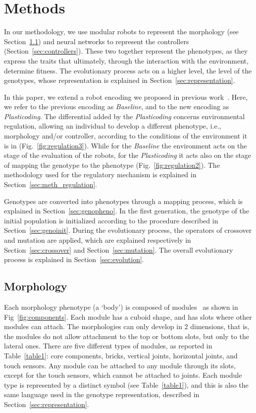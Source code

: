 \documentclass[utf8]{frontiersSCNS} %
\newcommand{\ka}[1]{\todo[color=blue!40, inline, author=Karine]{#1}}
\begin{document}
\section{Methods}
In our methodology, we use modular robots to represent the morphology (see Section~\ref{sec:morphology}) and neural networks to represent the controllers (Section~\ref{sec:controllers}). These two together represent the phenotypes, as they express the traits that ultimately, through the interaction with the environment, determine fitness. The evolutionary process acts on a higher level, the level of the genotypes, whose representation is explained in Section~\ref{sec:representation}. 

In this paper, we extend a robot encoding we proposed in previous work~\citep{miras2019effects}. Here, we refer to the previous encoding as \textit{Baseline}, and to the new encoding as \textit{Plasticoding}. The differential added by the \textit{Plasticoding} concerns environmental regulation, allowing an individual to develop a different phenotype, i.e., morphology and/or controller, according to the conditions of the environment it is in (Fig.~\ref{fig:regulation3}). While for the \textit{Baseline} the environment acts on the stage of the evaluation of the robots, for the \textit{Plasticoding} it acts also on the stage of mapping the genotype to the phenotype (Fig.~\ref{fig:regulation2}). The methodology used for the regulatory mechanism is explained in Section~\ref{sec:meth_regulation}.

Genotypes are converted into phenotypes through a mapping process, which is explained in Section~\ref{sec:genopheno}. In the first generation, the genotype of the initial population is initialized according to the procedure described in Section~\ref{sec:genoinit}.  During the evolutionary process, the operators of crossover and mutation are applied, which are explained respectively in Section~\ref{sec:crossover} and Section~\ref{sec:mutation}. The overall evolutionary process is explained in Section~\ref{sec:evolution}.

\subsection{Morphology}
\label{sec:morphology}
Each  morphology phenotype (a `body') is composed of modules~\citep{auerbach2014robogen} as shown in Fig~\ref{fig:components}. Each module has a cuboid shape, and has slots where other modules can attach. The morphologies can only develop in 2 dimensions, that is, the modules do not allow attachment to the top or bottom slots, but only to the lateral ones. There are five different types of modules, as reported in Table~\ref{table1}: core components, bricks, vertical joints, horizontal joints, and touch sensors. Any module can be attached to any module through its slots, except for the touch sensors, which cannot be attached to joints. Each module type is represented by a distinct symbol (see Table~\ref{table1}), and this is also the same language used in the genotype representation, described in Section~\ref{sec:representation}.  
 
\end{document}

